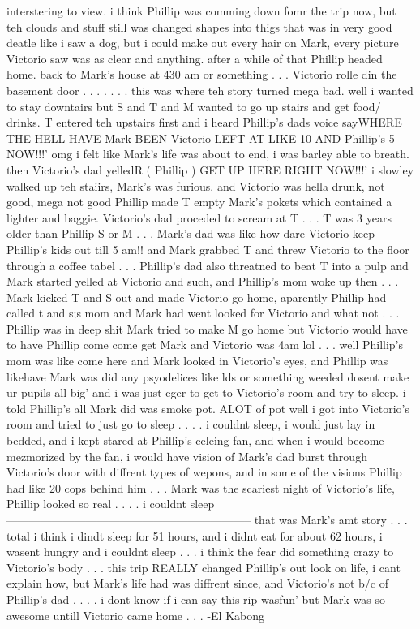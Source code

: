 \documentclass[12pt]{book}
\begin{document}
interstering to view. i think Phillip was comming down fomr the trip now, but teh clouds and stuff still was changed shapes into thigs that was in very good deatle like i saw a dog, but i could make out every hair on Mark, every picture Victorio saw was as clear and anything. after a while of that Phillip headed home. back to Mark's house at 430 am or something . . .  Victorio rolle din the basement door . . .   . . .  . this was where teh story turned mega bad. well i wanted to stay downtairs but S and T and M wanted to go up stairs and get food/ drinks. T entered teh upstairs first and i heard Phillip's dads voice sayWHERE THE HELL HAVE Mark BEEN Victorio LEFT AT LIKE 10 AND Phillip's 5 NOW!!!' omg i felt like Mark's life was about to end, i was barley able to breath. then Victorio's dad yelledR ( Phillip ) GET UP HERE RIGHT NOW!!!' i slowley walked up teh staiirs, Mark's was furious. and Victorio was hella drunk, not good, mega not good Phillip made T empty Mark's pokets which contained a lighter and baggie. Victorio's dad proceded to scream at T . . .  T was 3 years older than Phillip S or M . . .  Mark's dad was like how dare Victorio keep Phillip's kids out till 5 am!! and Mark grabbed T and threw Victorio to the floor through a coffee tabel . . .  Phillip's dad also threatned to beat T into a pulp and Mark started yelled at Victorio and such, and Phillip's mom woke up then . . .  Mark kicked T and S out and made Victorio go home, aparently Phillip had called t and s;s mom and Mark had went looked for Victorio and what not . . .  Phillip was in deep shit Mark tried to make M go home but Victorio would have to have Phillip come come get Mark and Victorio was 4am lol . . .  well Phillip's mom was like come here and Mark looked in Victorio's eyes, and Phillip was likehave Mark was did any psyodelices like lds or something weeded dosent make ur pupils all big' and i was just eger to get to Victorio's room and try to sleep. i told Phillip's all Mark did was smoke pot. ALOT of pot well i got into Victorio's room and tried to just go to sleep . . .  . i couldnt sleep, i would just lay in bedded, and i kept stared at Phillip's celeing fan, and when i would become mezmorized by the fan, i would have vision of Mark's dad burst through Victorio's door with diffrent types of wepons, and in some of the visions Phillip had like 20 cops behind him . . .  Mark was the scariest night of Victorio's life, Phillip looked so real . . .  . i couldnt sleep ----------------------------------------------------------------- that was Mark's amt story . . .  total i think i dindt sleep for 51 hours, and i didnt eat for about 62 hours, i wasent hungry and i couldnt sleep . . .  i think the fear did something crazy to Victorio's body . . .  this trip REALLY changed Phillip's out look on life, i cant explain how, but Mark's life had was diffrent since, and Victorio's not b/c of Phillip's dad . . .  . i dont know if i can say this rip wasfun' but Mark was so awesome untill Victorio came home . . .  -El Kabong
\end{document}
